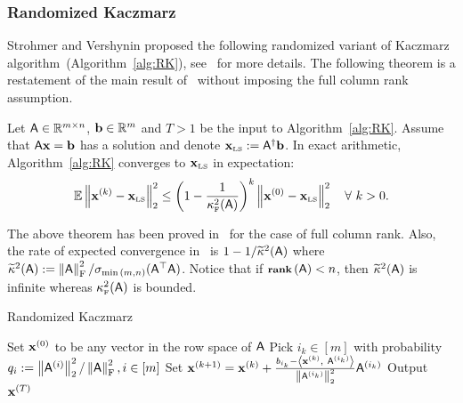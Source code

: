 \subsubsection*{Randomized Kaczmarz}
%
%
%
Strohmer and Vershynin proposed the following randomized variant of Kaczmarz algorithm~(Algorithm~\ref{alg:RK}), see~\cite{RK} for more details. The following theorem is a restatement of the main result of~\cite{RK} without imposing the full column rank assumption.
\begin{theorem}\label{thm:RK:consistent}
Let ${\mathsf{A} }\in\mathbb{R}^{m\times n}$, ${\mathbf b}\in\mathbb{R}^m$ and $T>1$ be the input to Algorithm~\ref{alg:RK}. Assume that ${\mathsf{A} } \mathbf{x} = {\mathbf b}$ has a solution and denote $\mathbf{x}_{\textrm{\tiny LS}}:={{\mathsf{A} }}^\dagger{\mathbf b}$. In exact arithmetic, Algorithm~\ref{alg:RK} converges to $\mathbf{x}_{\textrm{\tiny LS}}$ in expectation:
	\begin{equation}
		\EE \norm{\x^{(k)} - \xls}^2 \leq \left(1 - \frac1{\kappaFS(\matA)}\right)^k \norm{\x^{(0)} - \xls}^2\quad \forall\ k>0.
	\end{equation}
\end{theorem}
\begin{remark}
The above theorem has been proved in~\cite{RK} for the case of full column rank. Also, the rate of expected convergence in~\cite{RK} is $1-1/\widetilde{\kappa}^2 ({\mathsf{A} })$ where $\widetilde{\kappa}^2({\mathsf{A} }) := \left\|{\mathsf{A} }\right\|_{\textrm{F}}^2 / \sigma_{\min{(m,n)}}({\mathsf{A} }^\top {\ensuremath{\mathsf{A} }})$. Notice that if $\operatorname{\textbf{{\footnotesize rank}}}\left({\mathsf{A} }\right)< n$, then $\widetilde{\kappa}^2({\mathsf{A} })$ is infinite whereas $\kappa^2_{\textrm{\tiny F}}({\mathsf{A} })$ is bounded.
\end{remark}
%
%
\begin{algorithm}{}
	\caption{Randomized Kaczmarz~\cite{RK}}\label{alg:RK}
\begin{algorithmic}[1]
\State Set $\mathbf{x}^{(0)}$ to be any vector in the row space of ${\mathsf{A} }$
	\State Pick $i_k\in[m]$ with probability $q_i:=\left\|{\mathsf{A} }^{(i)}\right\|_2^2/\left\|{\mathsf{A} }\right\|_{\textrm{F}}^2, i\in [m]$
	\State Set $ \mathbf{x}^{(k+1)} = \mathbf{x}^{(k)}  + \frac{b_{i_k} - \left\langle {\mathbf{x}^{(k)}},\ {{\mathsf{A} }^{(i_k)} } \right\rangle}{\left\|{\mathsf{A} }^{(i_k)}\right\|_2^2} {\mathsf{A} }^{(i_k)}$
\EndFor
\State Output $\mathbf{x}^{(T)}$
\EndProcedure
\end{algorithmic}
\end{algorithm}
